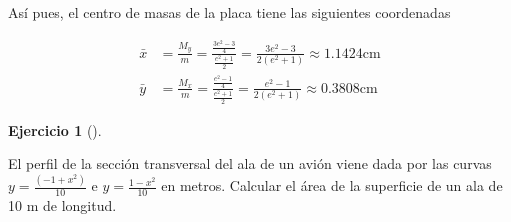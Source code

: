 \documentclass[
  a4paper,
]{scrreport}
\theoremstyle{definition}
\newtheorem{exercise}{Ejercicio}[chapter]
\theoremstyle{remark}
\begin{document}
\begin{tcolorbox}
Así pues, el centro de masas de la placa tiene las siguientes
coordenadas

\begin{align*}
\bar x 
&= \frac{M_y}{m} 
= \frac{\frac{3e^2-3}{4}}{\frac{e^2+1}{2}}
= \frac{3e^2-3}{2(e^2+1)} 
\approx 1.1424 \mbox{cm}\\
\bar y
&= \frac{M_x}{m} 
= \frac{\frac{e^2-1}{4}}{\frac{e^2+1}{2}}
= \frac{e^2-1}{2(e^2+1)} 
\approx 0.3808 \mbox{cm}
\end{align*}

\end{tcolorbox}

\begin{exercise}[]\protect\hypertarget{exr-presion-ala-avión}{}\label{exr-presion-ala-avión}

El perfil de la sección transversal del ala de un avión viene dada por
las curvas \(y=\frac{(-1+x^2)}{10}\) e \(y=\frac{1-x^2}{10}\) en metros.
Calcular el área de la superficie de un ala de 10 m de longitud.

\end{exercise}
\end{document}
